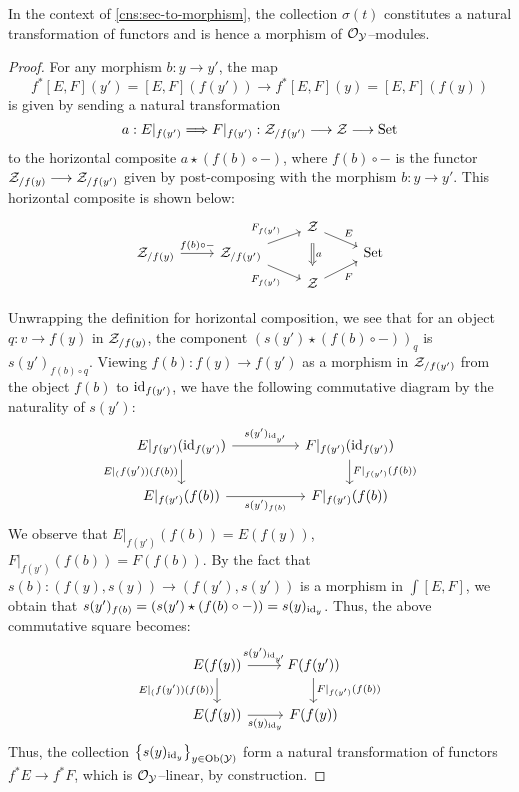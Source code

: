 \documentclass[11pt]{amsart}
\begin{document}
\begin{prop}\label{prop:sec-to-morphism}
In the context of \cref{cns:sec-to-morphism}, the collection $\sigma(t)$ constitutes
a natural transformation of functors and is hence a morphism of
$\mathcal{O}_\mathcal{Y}$--modules.
\end{prop}
\begin{proof}
For any morphism $b : y \to y'$, the map
\[
f^*[E, F](y') = [E, F](f(y')) \to f^*[E, F](y) = [E, F](f(y))
\]
is given by sending a natural transformation
\[
a : E|_{f(y')} \To F|_{f(y')} : \mcZ_{/f(y')} \to \mcZ \to \Set
\]
to the horizontal composite $a \star (f(b) \circ -)$, where $f(b) \circ -$
is the functor $\mcZ_{/f(y)} \to \mcZ_{/f(y')}$ given by post-composing with the
morphism $b : y \to y'$. This horizontal composite is shown below:
\[\begin{tikzcd}[row sep=tiny]
& &
\mcZ
  \ar[rd, "E"]
  \ar[dd, Rightarrow, "a", shorten=0.5em] & \\
\mcZ_{/f(y)} \ar[r, "f(b) \circ -"] &
\mcZ_{/f(y')}
  \ar[ru, "F_{f(y')}" above left]
  \ar[rd, "F_{f(y')}" below left] & &
\Set \\ & &
\mcZ
  \ar[ru, "F" below right] & \\
\end{tikzcd}\]
Unwrapping the definition for horizontal composition, we see that for an object
$q : v \to f(y)$ in $\mathcal{Z}_{/f(y)}$, the component
$(s(y') \star (f(b) \circ -))_{q}$
is $s(y')_{f(b) \circ q}$. Viewing $f(b) : f(y) \to f(y')$ as a morphism
in $\mathcal{Z}_{/f(y')}$ from the object $f(b)$ to $\mathrm{id}_{f(y')}$, we have the
following commutative diagram by the naturality of $s(y')$:
\[\begin{tikzcd}[column sep=huge]
E|_{f(y')}(\id_{f(y')})
  \ar[r, "s(y')_{\id_{y'}}"]
  \ar[d, "E|_(f(y'))(f(b))" left] &
F|_{f(y')}(\id_{f(y')})
  \ar[d, "F|_{f(y')}(f(b))"] \\
E|_{f(y')}(f(b))
  \ar[r, "s(y')_{f(b)}" below] &
F|_{f(y')}(f(b))
\end{tikzcd}\]
We observe that $E|_{f(y')}(f(b)) = E(f(y))$, $F|_{f(y')}(f(b)) = F(f(b))$.
By the fact that $s(b) : (f(y), s(y)) \to (f(y'), s(y'))$ is a morphism
in $\int [E, F]$, we obtain that
$s(y')_{f(b)} = (s(y') \star (f(b) \circ -)) = s(y)_{\mathrm{id}_y}$. Thus, the above
commutative square becomes:
\[\begin{tikzcd}
E(f(y))
  \ar[r, "s(y')_{\id_{y'}}"]
  \ar[d, "E|_(f(y'))(f(b))" left] &
F(f(y'))
  \ar[d, "F|_{f(y')}(f(b))"] \\
E(f(y))
  \ar[r, "s(y)_{\id_{y}}" below] &
F(f(y))
\end{tikzcd}\]
Thus, the collection $\set{s(y)_{\id_{y}}}_{y \in \Ob{\mcY}}$
form a natural transformation of functors $f^*E \to f^*F$, which is
$\mathcal{O}_{\mathcal{Y}}$--linear, by construction.
\end{proof}
\end{document}
